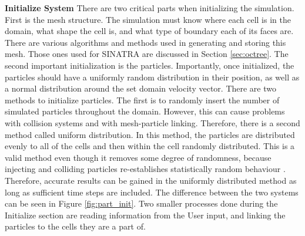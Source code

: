 \indent \textbf{Initialize System} There are two critical parts when initializing the simulation. First is the mesh structure. The simulation must know where each cell is in the domain, what shape the cell is, and what type of boundary each of its faces are. There are various algorithms and methods used in generating and storing this mesh. Those ones used for SINATRA are discussed in Section \ref{sec:octree}. The second important initialization is the particles. Importantly, once initialized, the particles should have a uniformly random distribution in their position, as well as a normal distribution around the set domain velocity vector. There are two methods to initialize particles. The first is to randomly insert the number of simulated particles throughout the domain. However, this can cause problems with collision systems and with mesh-particle linking. Therefore, there is a second method called uniform distribution. In this method, the particles are distributed evenly to all of the cells and then within the cell randomly distributed. This is a valid method even though it removes some degree of randomness, because injecting and colliding particles re-establishes statistically random behaviour \cite{Galvez2018a} \cite{bird_dsmc} \cite{mac_thesis}. Therefore, accurate results can be gained in the uniformly distributed method as long as sufficient time steps are included. The difference between the two systems can be seen in Figure \ref{fig:part_init}. Two smaller processes done during the Initialize section are reading information from the User input, and linking the particles to the cells they are a part of. \par

